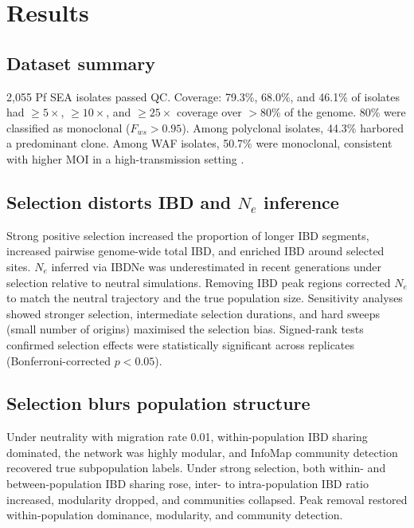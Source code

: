 \documentclass[11pt]{article}
\begin{document}
\section{Results}
\subsection{Dataset summary}
2{,}055 Pf SEA isolates passed QC. Coverage: 79.3\%, 68.0\%, and 46.1\% of isolates had $\geq 5\times$, $\geq 10\times$, and $\geq 25\times$ coverage over $>$80\% of the genome. 80\% were classified as monoclonal ($F_{ws}>0.95$). Among polyclonal isolates, 44.3\% harbored a predominant clone. Among WAF isolates, 50.7\% were monoclonal, consistent with higher MOI in a high-transmission setting \citep{r28}.

\subsection{Selection distorts IBD and $N_e$ inference}
Strong positive selection increased the proportion of longer IBD segments, increased pairwise genome-wide total IBD, and enriched IBD around selected sites. $N_e$ inferred via IBDNe was underestimated in recent generations under selection relative to neutral simulations. Removing IBD peak regions corrected $N_e$ to match the neutral trajectory and the true population size. Sensitivity analyses showed stronger selection, intermediate selection durations, and hard sweeps (small number of origins) maximised the selection bias. Signed-rank tests confirmed selection effects were statistically significant across replicates (Bonferroni-corrected $p<0.05$).

\subsection{Selection blurs population structure}
Under neutrality with migration rate 0.01, within-population IBD sharing dominated, the network was highly modular, and InfoMap community detection recovered true subpopulation labels. Under strong selection, both within- and between-population IBD sharing rose, inter- to intra-population IBD ratio increased, modularity dropped, and communities collapsed. Peak removal restored within-population dominance, modularity, and community detection.
\end{document}

